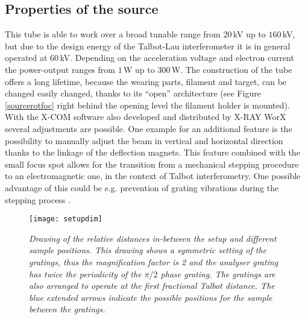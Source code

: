 \subsection{Properties of the source}\label{subsec:sprop}
This tube is able to work over a broad tunable range from $20\,$kV up to $160\,$kV, but due to the design energy of the Talbot-Lau interferometer it is in general operated at $60\,$kV. Depending on the acceleration voltage and electron current the power-output ranges from $1\,$W up to $300\,$W. The construction of the tube offers a long lifetime, because the wearing parts, filament and target, can be changed easily changed, thanks to its \enquote{open} architecture (see Figure \ref{sourcerotfoc} right behind the opening level the filament holder is mounted). With the X-COM software \citep{X-COMsoft} also developed and distributed by X-RAY WorX several adjustments are possible. One example for an additional feature is the possibility to manually adjust the beam in vertical and horizontal direction thanks to the linkage of the deflection magnets. This feature combined with the small focus spot allows for the transition from a mechanical stepping procedure to an electromagnetic one, in the context of Talbot interferometry. One possible advantage of this could be e.g. prevention of grating vibrations during the stepping process \citep{Harmon2015}.
\begin{figure}[h]
	\begin{center}
		\texttt{[image: setupdim]}
	\end{center}
	\caption[Drawing of the relative distances between the particular parts of the setup]{\textit{Drawing of the relative distances in-between the setup and different sample positions. This drawing shows a symmetric setting of the gratings, thus the magnification factor is 2 and the analyser grating has twice the periodicity of the $\pi/2 $ phase grating. The gratings are also arranged to operate at the first fractional Talbot distance. The blue extended arrows indicate the possible positions for the sample between the gratings.}}
	\label{setupdim}
\end{figure} 
